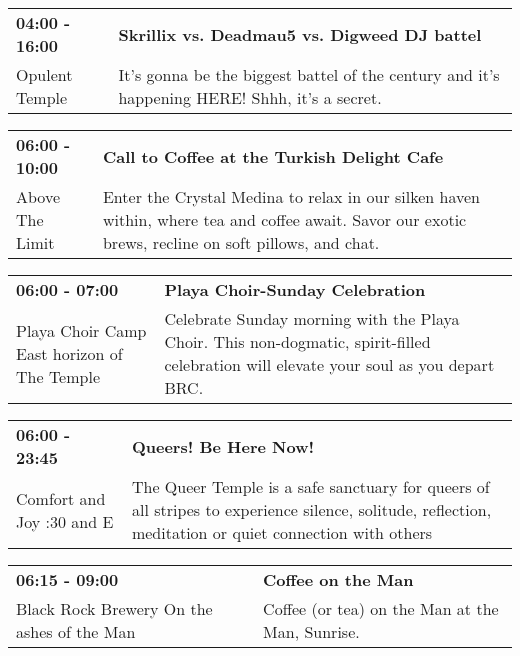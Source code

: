 \begin{tabular}{ p{1in} p{2.2in} }
    \textbf{04:00 - 16:00} & \textbf{Skrillix vs. Deadmau5 vs. Digweed DJ battel} \\
    Opulent Temple \newline  & It's gonna be the biggest battel of the century and it's happening HERE! Shhh, it's a secret. \\
    \hline 
\end{tabular}
    
\begin{tabular}{ p{1in} p{2.2in} }
    \textbf{06:00 - 10:00} & \textbf{Call to Coffee at the Turkish Delight Cafe} \\
    Above The Limit \newline  & Enter the Crystal Medina to relax in our silken haven within, where tea and coffee await. Savor our exotic brews, recline on soft pillows, and chat. \\
    \hline 
\end{tabular}
    
\begin{tabular}{ p{1in} p{2.2in} }
    \textbf{06:00 - 07:00} & \textbf{Playa Choir-Sunday Celebration} \\
    Playa Choir Camp \newline East horizon of The Temple & Celebrate Sunday morning with the Playa Choir. This non-dogmatic, spirit-filled celebration will elevate your soul as you depart BRC. \\
    \hline 
\end{tabular}
    
\begin{tabular}{ p{1in} p{2.2in} }
    \textbf{06:00 - 23:45} & \textbf{Queers! Be Here Now!} \\
    Comfort and Joy \newline 7:30 and E & The Queer Temple is a safe sanctuary for queers of all stripes to experience silence, solitude, reflection, meditation or quiet connection with others \\
    \hline 
\end{tabular}
    
\begin{tabular}{ p{1in} p{2.2in} }
    \textbf{06:15 - 09:00} & \textbf{Coffee on the Man} \\
    Black Rock Brewery \newline On the ashes of the Man & Coffee (or tea) on the Man at the Man, Sunrise. \\
    \hline 
\end{tabular}
    
